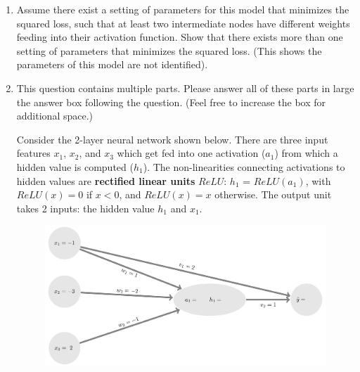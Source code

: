 \documentclass[11pt]{article}
\begin{document}
\begin{enumerate}
\begin{answertext}{22cm}{}
As we have $\beta_j \geq 0$ and $\frac{\partial^2h_j(g(w_1, \ldots, w_k))}{\partial^2 w_i} \geq 0$ as we have proved above, we have $\frac {\partial^2 H}{\partial^2 w_i} \geq 0$ for all $w_i$. Thus, H is convex to all $w_i$ \\
Secondly take the second derivative with respect to $\beta_j$:
\begin{align*}
\frac {\partial^2 H}{\partial^2 \beta_j} =& \frac {\partial }{\partial \beta_j}\frac{\partial^2h_j(g(w_1, \ldots, w_k))}{\partial^2 w_i} \\
=& 0
\end{align*}
As  $\frac {\partial^2 H}{\partial^2 \beta_j} \geq 0$, H is also convex to all $\beta_j$. Thus, we have shown that the likelihood (H) is convex to all weight parameters ($w_i$ and $\beta_j$).
\end{answertext} 
\pagebreak

\item Assume there exist a setting of parameters for this model that minimizes the squared loss, such that at least two intermediate nodes have different weights feeding into their activation function.
Show that there exists more than one setting of parameters that minimizes the squared loss.  (This shows the parameters of this model are not identified).

\begin{answertext}{10cm}{}


  
\end{answertext} 

\pagebreak

\item
This question contains multiple parts. Please answer all of these parts in large the answer box following the question. (Feel free to increase the box for additional space.)

Consider the 2-layer neural network shown below. There are three input features $x_1$, $x_2$, and $x_3$ which get fed into one activation ($a_1$) from which a hidden value is computed ($h_1$). The non-linearities connecting activations to hidden values are \textbf{rectified linear units} $ReLU$: $h_1$ = $ReLU(a_1)$, with $ReLU(x) = 0$ if $x < 0$, and $ReLU(x) = x$ otherwise. The output unit takes 2 inputs: the hidden value $h_1$ and $x_1$.

\begin{figure}[htbp]
 \centerline{\includegraphics[scale=0.35]{grad_example.png}}
 \label{fig:backprop}
\end{figure}


\end{enumerate}
\end{document}
